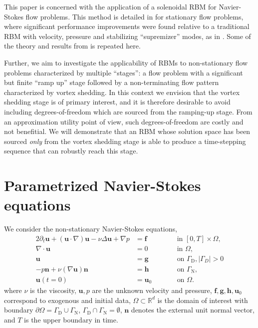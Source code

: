 \documentclass[a4paper]{jpconf}
\begin{document}
This paper is concerned with the application of a solenoidal RBM for
Navier-Stokes flow problems.  This method is detailed in
\cite{Fonn2018fdc} for stationary flow problems, where significant
performance improvements were found relative to a traditional RBM with
velocity, pressure and stabilizing ``supremizer'' modes, as in
\cite{Ballarin2015ssp}.  Some of the theory and results from
\cite{Fonn2018fdc} is repeated here.

Further, we aim to investigate the applicability of RBMs to
non-stationary flow problems characterized by multiple ``stages'': a
flow problem with a significant but finite ``ramp up'' stage followed
by a non-terminating flow pattern characterized by vortex shedding.
In this context we envision that the vortex shedding stage is of
primary interest, and it is therefore desirable to avoid including
degrees-of-freedom which are sourced from the ramping-up stage.  From
an approximation utility point of view, such degrees-of-freedom are
costly and not benefitial.  We will demonstrate that an RBM whose
solution space has been sourced \emph{only} from the vortex shedding
stage is able to produce a time-stepping sequence that can robustly
reach this stage.

\section{Parametrized Navier-Stokes equations}

\label{sec:setting}
We consider the non-stationary Navier-Stokes equations,
\begin{alignat}{2}
  \label{eqn:ns-1}
  \partial_t \bm u + (\bm u \cdot \nabla) \bm u - \nu \Delta \bm u + \nabla p &= \bm f && \qquad \text{in } [0,T] \times \Omega, \\
  \label{eqn:ns-2}
  \nabla \cdot \bm u &= 0 && \qquad \text{in } \Omega, \\
  \label{eqn:ns-3}
  \bm u &= \bm g && \qquad \text{on } \Gamma_\text{D}, |\Gamma_D| > 0 \\
  \label{eqn:ns-4}
  -p \bm n + \nu (\nabla \bm u) \bm n &= \bm h && \qquad \text{on } \Gamma_\text{N}, \\
  \label{eqn:ns-5}
  \bm u(t=0) &= \bm u_0 && \qquad \text{on } \Omega.
\end{alignat}
where $\nu$ is the viscosity, $\bm u, p$ are the unknown velocity and
pressure, $\bm{f},\bm{g},\bm{h},\bm{u}_0$ correspond to exogenous and
initial data, $\Omega \subset \mathbb R^d$ is the domain of interest
with boundary
$\partial \Omega = \Gamma_\text{D} \cup \Gamma_\text{N}$,
$\Gamma_\text{D} \cap \Gamma_\text{N} = \emptyset$, $\bm{n}$ denotes
the external unit normal vector, and $T$ is the upper boundary in
time.
\end{document}

